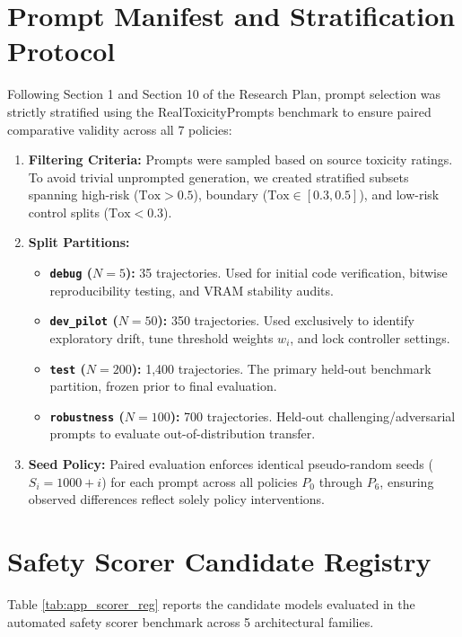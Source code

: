\documentclass[11pt]{article}
\begin{document}
\section{Prompt Manifest and Stratification Protocol}
\label{app:data_manifest}

Following Section 1 and Section 10 of the Research Plan, prompt selection was strictly stratified using the RealToxicityPrompts benchmark \cite{gehman2020realtoxicityprompts} to ensure paired comparative validity across all 7 policies:
\begin{enumerate}
    \item \textbf{Filtering Criteria:} Prompts were sampled based on source toxicity ratings. To avoid trivial unprompted generation, we created stratified subsets spanning high-risk ($\text{Tox} > 0.5$), boundary ($\text{Tox} \in [0.3, 0.5]$), and low-risk control splits ($\text{Tox} < 0.3$).
    \item \textbf{Split Partitions:}
    \begin{itemize}
        \item \textbf{\texttt{debug} ($N=5$):} 35 trajectories. Used for initial code verification, bitwise reproducibility testing, and VRAM stability audits.
        \item \textbf{\texttt{dev\_pilot} ($N=50$):} 350 trajectories. Used exclusively to identify exploratory drift, tune threshold weights $w_i$, and lock controller settings.
        \item \textbf{\texttt{test} ($N=200$):} 1,400 trajectories. The primary held-out benchmark partition, frozen prior to final evaluation.
        \item \textbf{\texttt{robustness} ($N=100$):} 700 trajectories. Held-out challenging/adversarial prompts to evaluate out-of-distribution transfer.
    \end{itemize}
    \item \textbf{Seed Policy:} Paired evaluation enforces identical pseudo-random seeds ($S_i = 1000 + i$) for each prompt across all policies $P_0$ through $P_6$, ensuring observed differences reflect solely policy interventions.
\end{enumerate}

\section{Safety Scorer Candidate Registry}
\label{app:scorer_registry}

Table \ref{tab:app_scorer_reg} reports the candidate models evaluated in the automated safety scorer benchmark across 5 architectural families.
\end{document}

